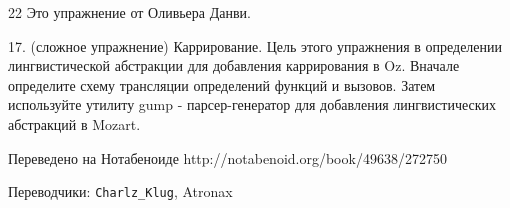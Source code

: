 22 Это упражнение от Оливьера Данви.

17. (сложное упражнение) Каррирование. Цель этого упражнения в определении лингвистической абстракции для добавления каррирования в Oz. Вначале определите схему трансляции определений функций и вызовов. Затем используйте утилиту gump - парсер-генератор для добавления лингвистических абстракций в Mozart.

Переведено на Нотабеноиде
http://notabenoid.org/book/49638/272750

Переводчики: \verb|Charlz_Klug|, Atronax

